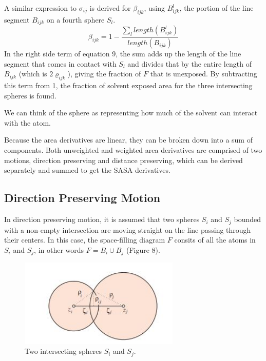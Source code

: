 \documentclass{article}
\newcommand{\R}{\mathbb{R}}
\begin{document}
A similar expression to $\sigma_{ij}$ is derived for $\beta_{ijk}$, using $B^l_{ijk}$, the portion of the line segment $B_{ijk}$ on a fourth sphere $S_l$. 
\begin{equation}
\beta_{ijk} = 1 - \frac{\sum_{l}length(B^l_{ijk})}{length(B_{ijk})}
\end{equation}
In the right side term of equation 9, the sum adds up the length of the line segment that comes in contact with $S_l$ and divides that by the entire length of $B_{ijk}$ (which is $2\varrho_{ijk}$), giving the fraction of $F$ that is unexposed. By subtracting this term from 1, the fraction of solvent exposed area for the three intersecting spheres is found.

We can think of the sphere as representing how much of the solvent can interact with the atom. 

Because the area derivatives are linear, they can be broken down into a sum of components. Both unweighted and weighted area derivatives are comprised of two motions, direction preserving and distance preserving, which can be derived separately and summed to get the SASA derivatives.
 
\subsection{Direction Preserving Motion} 
In direction preserving motion, it is assumed that two spheres $S_i$ and $S_j$ bounded with a non-empty intersection are moving straight on the line passing through their centers.
In this case, the space-filling diagram $F$ consits of all the atoms in $S_i$ and $S_j$, in other words $F = B_i \cup B_j$ (Figure 8).

\begin{figure}[h!]
\caption{Two intersecting spheres $S_i$ and $S_j$.\cite{Bryant}}
\centerline{\includegraphics[width=3in]{Figure6}}
\end{figure}
\end{document}
